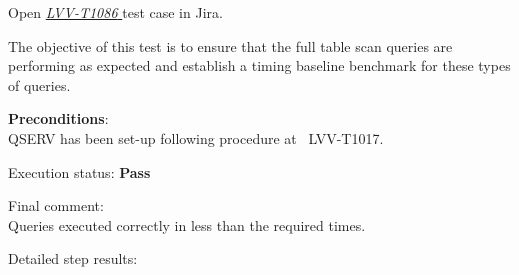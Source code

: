 \documentclass[DM,lsstdraft,STR,toc]{lsstdoc}
\begin{document}
Open  \href{https://jira.lsstcorp.org/secure/Tests.jspa#/testCase/LVV-T1086}{\textit{ LVV-T1086 } }
test case in Jira.

    The objective of this test is to ensure that the full table scan queries
are performing as expected and establish a timing baseline benchmark for
these types of queries.


    \textbf{ Preconditions}:\\
    QSERV has been set-up following procedure at ~LVV-T1017.


    Execution status: {\bf Pass }

    Final comment:\\Queries executed correctly in less than the required times.



    Detailed step results:
\end{document}
